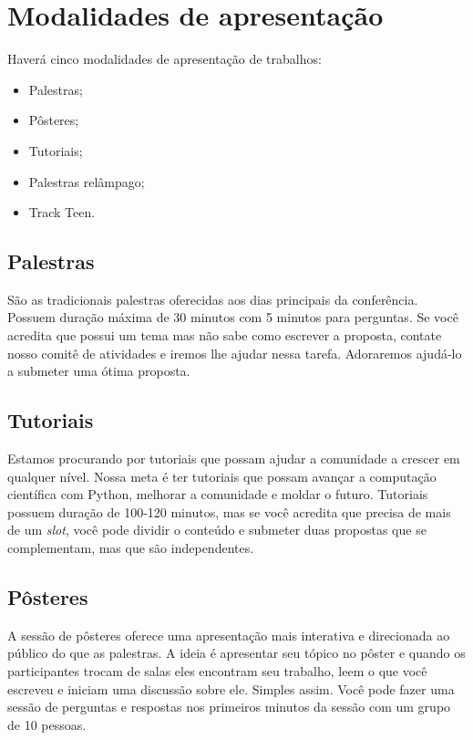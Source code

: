 \documentclass[report,a4paper,twocolumn]{memoir}
\begin{document}
\chapter*{Modalidades de apresentação}

Haverá 
cinco
%
modalidades de apresentação de trabalhos:
\begin{itemize}
\item Palestras;
\item Pôsteres;
\item Tutoriais;
\item Palestras relâmpago;
\item Track Teen.
\end{itemize}

\section*{Palestras}

São as tradicionais palestras oferecidas aos dias principais da conferência. Possuem duração máxima de 30 minutos com 5 minutos para perguntas. Se você acredita
que possui um tema mas não sabe como escrever a proposta, contate nosso comitê
de atividades e iremos lhe ajudar nessa tarefa. Adoraremos ajudá-lo a submeter
uma ótima proposta.

\section*{Tutoriais}

Estamos procurando por tutoriais que possam ajudar a comunidade a crescer em qualquer nível. Nossa meta é ter tutoriais que possam avançar a computação científica com Python, melhorar a comunidade e moldar o futuro. Tutoriais possuem duração de 100-120 minutos, mas se você acredita que precisa de mais de um \emph{slot}, você pode dividir o conteúdo e submeter duas propostas que se complementam, mas que são independentes.

\section*{Pôsteres}

A sessão de pôsteres oferece uma apresentação mais interativa e direcionada ao público do que as palestras. A ideia é apresentar seu tópico no pôster e quando os participantes trocam de salas eles encontram seu trabalho, leem o que você escreveu e iniciam uma discussão sobre ele. Simples assim. Você pode fazer uma sessão de perguntas e respostas nos primeiros minutos da sessão com um grupo de 10 pessoas.
\end{document}
